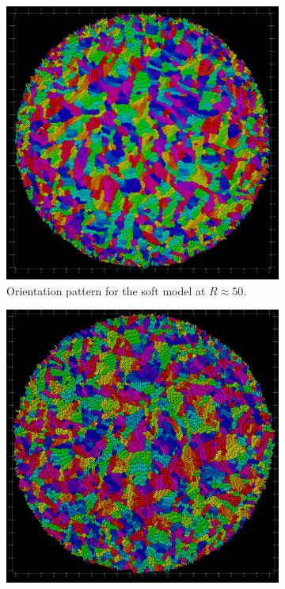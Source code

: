 \documentclass[conference]{IEEEtran}
\begin{document}
\begin{figure}[h]
    \centering
    \begin{subfigure}[b]{0.49\columnwidth}
        \centering
        \includegraphics[width=\linewidth]{figures/orientation_comparisons/r50_soft_e-2.jpeg}
        \caption{Orientation pattern for the soft model at $R \approx 50$.}
        \label{fig:packing_hard}
    \end{subfigure}
    \begin{subfigure}[b]{0.49\columnwidth}
        \centering
        \includegraphics[width=\linewidth]{figures/orientation_comparisons/r50_hard_e-2.jpeg}

\end{subfigure}
\end{figure}
\end{document}
